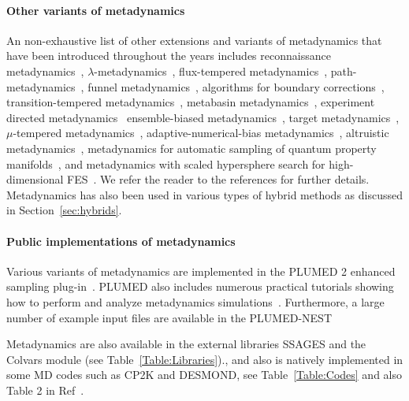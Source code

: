 \documentclass[9pt,review]{livecoms}
\begin{document}
\paragraph{Other variants of metadynamics}
\label{sec:metad_variants}
An non-exhaustive list of other extensions and variants of metadynamics that have been introduced throughout the years includes
reconnaissance metadynamics~\cite{10.1073/pnas.1011511107},
$\lambda$-metadynamics~\cite{10.1021/jz200808x},
flux-tempered metadynamics~\cite{Singh-JStatPhys-2011,Singh-JCTC-2012},
path-metadynamics~\cite{10.1103/physrevlett.109.020601,10.1063/1.5027392},
funnel metadynamics~\cite{10.1073/pnas.1303186110,10.1038/s41596-020-0342-4},
algorithms for boundary corrections~\cite{McGovern-JCP-2013},
transition-tempered metadynamics~\cite{Dama-JCTC-2014}, metabasin metadynamics~\cite{10.1021/acs.jctc.5b00907},
experiment directed metadynamics~\cite{White_EDM_2015}
ensemble-biased metadynamics~\cite{Marinelli_EnsembleBiased_2015},
target metadynamics~\cite{GilLey_TargetMetaD_2016},
$\mu$-tempered metadynamics~\cite{10.1063/1.4937939},
adaptive-numerical-bias metadynamics~\cite{10.1002/jcc.25066},
altruistic metadynamics~\cite{10.1021/acs.jpcb.6b00087,10.1063/1.4978939},
metadynamics for automatic sampling of quantum property manifolds~\cite{Lindner_ASQPM-MetaD_2019},
and
metadynamics with scaled hypersphere search for high-dimensional FES~\cite{Mitsuta_SHS-MetaD_JCTC2020}.
We refer the reader to the references for further details. Metadynamics has also been used in various types of hybrid methods as discussed in Section~\ref{sec:hybrids}.

\paragraph{Public implementations of metadynamics}
\label{sec:meta-impl}
Various variants of metadynamics are implemented in the PLUMED 2 enhanced sampling plug-in~\cite{Bonomi-CPC-2009,Tribello2014,plumed-nest}. PLUMED also includes numerous practical tutorials showing how to perform and analyze metadynamics simulations~\cite{plumed_masterclass}. Furthermore, a large number of example input files are
available in the PLUMED-NEST~\cite{plumed-nest,plumed_nest_url}

Metadynamics are also available in the external libraries SSAGES and the Colvars module (see Table~\ref{Table:Libraries})., and also is natively implemented in some MD codes such as CP2K and DESMOND, see Table~\ref{Table:Codes} and also Table 2 in Ref~\cite{BussiLaio_ReviewMetaD_2020}.
\end{document}
